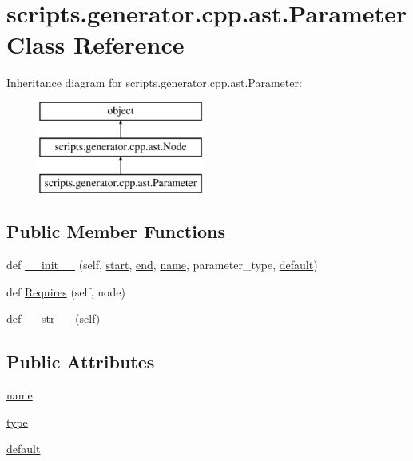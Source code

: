 \hypertarget{classscripts_1_1generator_1_1cpp_1_1ast_1_1_parameter}{}\section{scripts.\+generator.\+cpp.\+ast.\+Parameter Class Reference}
\label{classscripts_1_1generator_1_1cpp_1_1ast_1_1_parameter}
Inheritance diagram for scripts.\+generator.\+cpp.\+ast.\+Parameter\+:\begin{figure}[H]
\begin{center}
\leavevmode
\includegraphics[height=3.000000cm]{d7/dd2/classscripts_1_1generator_1_1cpp_1_1ast_1_1_parameter}
\end{center}
\end{figure}
\subsection*{Public Member Functions}
\begin{DoxyCompactItemize}
\item 
def \mbox{\hyperlink{classscripts_1_1generator_1_1cpp_1_1ast_1_1_parameter_af3739e6b543e68732e6a0d714f5b7191}{\+\_\+\+\_\+init\+\_\+\+\_\+}} (self, \mbox{\hyperlink{classscripts_1_1generator_1_1cpp_1_1ast_1_1_node_a27ce0a583baee598b75ac6dd21f8575b}{start}}, \mbox{\hyperlink{classscripts_1_1generator_1_1cpp_1_1ast_1_1_node_a8e3394f9dd405352610ff9be4f284e2c}{end}}, \mbox{\hyperlink{classscripts_1_1generator_1_1cpp_1_1ast_1_1_parameter_a2a51cbef506ae066036ad898ed247b5d}{name}}, parameter\+\_\+type, \mbox{\hyperlink{classscripts_1_1generator_1_1cpp_1_1ast_1_1_parameter_ab6461fc01fea3b8e9c0fd0aac9428f08}{default}})
\item 
def \mbox{\hyperlink{classscripts_1_1generator_1_1cpp_1_1ast_1_1_parameter_a15586f19bd17ec067ce6e6676a6244df}{Requires}} (self, node)
\item 
def \mbox{\hyperlink{classscripts_1_1generator_1_1cpp_1_1ast_1_1_parameter_aa9fc0eabfd14424745b9f82b6d99e730}{\+\_\+\+\_\+str\+\_\+\+\_\+}} (self)
\end{DoxyCompactItemize}
\subsection*{Public Attributes}
\begin{DoxyCompactItemize}
\item 
\mbox{\hyperlink{classscripts_1_1generator_1_1cpp_1_1ast_1_1_parameter_a2a51cbef506ae066036ad898ed247b5d}{name}}
\item 
\mbox{\hyperlink{classscripts_1_1generator_1_1cpp_1_1ast_1_1_parameter_af16a26ffc686971c30bcf4cbe2624347}{type}}
\item 
\mbox{\hyperlink{classscripts_1_1generator_1_1cpp_1_1ast_1_1_parameter_ab6461fc01fea3b8e9c0fd0aac9428f08}{default}}
\end{DoxyCompactItemize}


